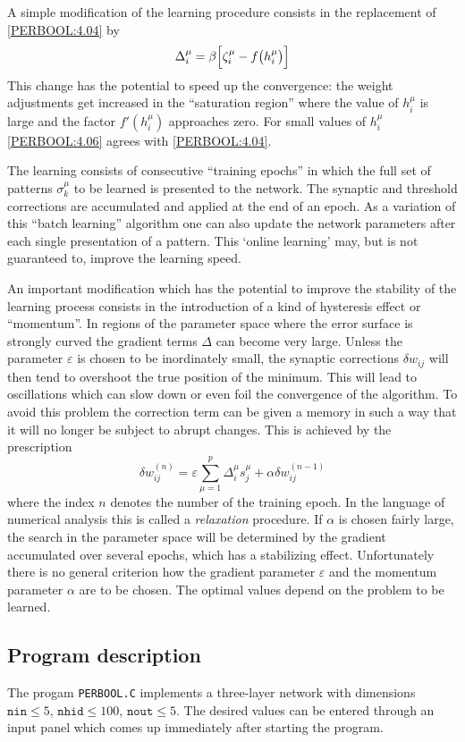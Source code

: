 A simple modification of the learning procedure consists in the replacement of \eqref{PERBOOL:4.04} by
\begin{equation}\label{PERBOOL:4.06}
\Delta_i^\mu=\beta\Bigl[\zeta_i^\mu-f\bigl(h_i^\mu\bigr)\Bigr]
\end{equation}
This change has the potential to speed up the convergence: the weight adjustments get increased in the ``saturation region'' where the value of $h_i^\mu$ is large and the factor $f'(h_i^\mu)$ approaches zero. For small values of $h_i^\mu$ \eqref{PERBOOL:4.06} agrees with \eqref{PERBOOL:4.04}.

The learning consists of consecutive ``training epochs'' in which the full set of patterns $\sigma_k^\mu$ to be learned is presented to the network. The synaptic and threshold corrections are accumulated and applied at the end of an epoch. As a variation of this ``batch learning'' algorithm one can also update the network parameters after each single presentation of a pattern. This `online learning' may, but is not guaranteed to, improve the learning speed.

An important modification which has the potential to improve the stability of the learning process consists in the introduction of a kind of hysteresis effect or ``momentum''. In regions of the parameter space where the error surface is strongly curved the gradient terms $\Delta$ can become very large. Unless the parameter $\varepsilon$ is chosen to be inordinately small, the synaptic corrections $\delta w_{ij}$ will then tend to overshoot the true position of the minimum. This will lead to oscillations which can slow down or even foil the convergence of the
algorithm. To avoid this problem the correction term can be given a memory in such a way that it will no longer be subject to abrupt changes. This is achieved by the prescription
\begin{equation}
\delta w_{ij}^{(n)}=\varepsilon\sum_{\mu=1}^p\Delta_i^\mu s_j^\mu+\alpha\delta w_{ij}^{(n-1)}
\end{equation}
where the index $n$ denotes the number of the training epoch. In the language of numerical analysis this is called a \emph{relaxation} procedure. If $\alpha$ is chosen fairly large, the search in the parameter space will be determined by the gradient accumulated over several epochs, which has a stabilizing effect. Unfortunately there is no general criterion how the gradient parameter $\varepsilon$ and the momentum parameter $\alpha$ are to be chosen. The optimal values depend on the problem to be learned.
\subsection{Program description}\label{sec:C.1}
The progam \texttt{PERBOOL.C} implements a three-layer network with dimensions $\texttt{nin}\leq5$, $\texttt{nhid}\leq100$, $\texttt{nout}\leq5$. The desired values can be entered through an input panel which comes up immediately after starting the program.

